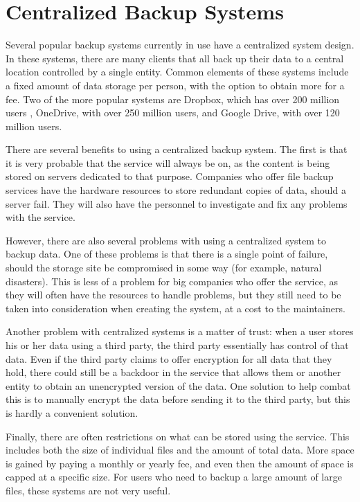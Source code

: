 \documentclass[12pt]{report}
\begin{document}
\section{Centralized Backup Systems}
Several popular backup systems currently in use have a centralized system design. In these systems, there are many clients that all back up their data to a central location controlled by a single entity. Common elements of these systems include a fixed amount of data storage per person, with the option to obtain more for a fee. Two of the more popular systems are Dropbox, which has over 200 million users \cite{dropboxusers}, OneDrive, with over 250 million users, and Google Drive, with over 120 million users.

There are several benefits to using a centralized backup system. The first is that it is very probable that the service will always be on, as the content is being stored on servers dedicated to that purpose. Companies who offer file backup services have the hardware resources to store redundant copies of data, should a server fail. They will also have the personnel to investigate and fix any problems with the service.

However, there are also several problems with using a centralized system to backup data. One of these problems is that there is a single point of failure, should the storage site be compromised in some way (for example, natural disasters). This is less of a problem for big companies who offer the service, as they will often have the resources to handle problems, but they still need to be taken into consideration when creating the system, at a cost to the maintainers.

Another problem with centralized systems is a matter of trust: when a user stores his or her data using a third party, the third party essentially has control of that data. Even if the third party claims to offer encryption for all data that they hold, there could still be a backdoor in the service that allows them or another entity to obtain an unencrypted version of the data. One solution to help combat this is to manually encrypt the data before sending it to the third party, but this is hardly a convenient solution.

Finally, there are often restrictions on what can be stored using the service. This includes both the size of individual files and the amount of total data. More space is gained by paying a monthly or yearly fee, and even then the amount of space is capped at a specific size. For users who need to backup a large amount of large files, these systems are not very useful.
\end{document}
